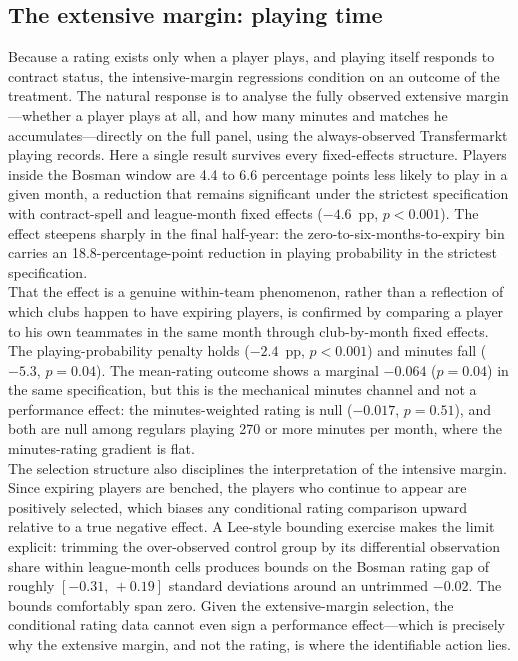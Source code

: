 \documentclass{article}
\begin{document}
\subsection{The extensive margin: playing time}
\label{sec:results-extensive}

Because a rating exists only when a player plays, and playing itself responds to
contract status, the intensive-margin regressions condition on an outcome of the
treatment. The natural response is to analyse the fully observed extensive
margin---whether a player plays at all, and how many minutes and matches he
accumulates---directly on the full panel, using the always-observed
Transfermarkt playing records. Here a single result survives every
fixed-effects structure. Players inside the Bosman window are 4.4 to 6.6
percentage points less likely to play in a given month, a reduction that remains
significant under the strictest specification with contract-spell and
league-month fixed effects ($-4.6$~pp, $p < 0.001$). The effect steepens sharply
in the final half-year: the zero-to-six-months-to-expiry bin carries an
18.8-percentage-point reduction in playing probability in the strictest
specification. \\

That the effect is a genuine within-team phenomenon, rather than a reflection of
which clubs happen to have expiring players, is confirmed by comparing a player
to his own teammates in the same month through club-by-month fixed effects. The
playing-probability penalty holds ($-2.4$~pp, $p < 0.001$) and minutes fall
($-5.3$, $p = 0.04$). The mean-rating outcome shows a marginal $-0.064$
($p = 0.04$) in the same specification, but this is the mechanical minutes
channel and not a performance effect: the minutes-weighted rating is null
($-0.017$, $p = 0.51$), and both are null among regulars playing 270 or more
minutes per month, where the minutes-rating gradient is flat. \\

The selection structure also disciplines the interpretation of the intensive
margin. Since expiring players are benched, the players who continue to appear
are positively selected, which biases any conditional rating comparison upward
relative to a true negative effect. A Lee-style bounding exercise makes the
limit explicit: trimming the over-observed control group by its differential
observation share within league-month cells produces bounds on the Bosman rating
gap of roughly $[-0.31,\, +0.19]$ standard deviations around an untrimmed
$-0.02$. The bounds comfortably span zero. Given the extensive-margin selection,
the conditional rating data cannot even sign a performance effect---which is
precisely why the extensive margin, and not the rating, is where the
identifiable action lies.
\end{document}
